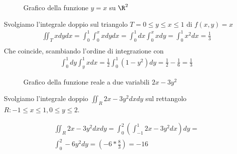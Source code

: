 \begin{exmp}
    \begin{figure}[htbp]
        \centering
        \caption{Grafico della funzione $y = x$ su $\R^2$}
        \label{2varplot}
    \end{figure}
    Svolgiamo l'integrale doppio sul triangolo $ T = 0 \leq y \leq x \leq 1$ di
    $f(x,y) = x$
    \begin{equation*}
        \begin{aligned}
            \iint_T x dydx = \int_0^1 \int_0^x x dydx = \int_0^1 dx \int_0^x x dy = \int_0^1 x^2 dx = \frac{1}{3} \\
        \end{aligned}
    \end{equation*}
    Che coincide, scambiando l'ordine di integrazione con
    \begin{equation*}
        \begin{aligned}
            \int_0^1 dy \int_y^1 x dx = \frac{1}{2} \int_0^1 (1-y^2) dy = \frac{1}{2} - \frac{1}{6} = \frac{1}{3}
        \end{aligned}
    \end{equation*}

\end{exmp}

\begin{exmp}
    \begin{figure}[htbp]
        \centering
        \caption{Grafico della funzione reale a due variabili $2x-3y^2$}
        \label{2varplot2}
    \end{figure}
    Svolgiamo l'integrale doppio $\iint_R 2x-3y^2 dx dy$ sul rettangolo $R: -1
    \leq x \leq 1, 0 \leq y \leq 2$.

    \begin{equation*}
        \begin{aligned}
            \iint_R 2x-3y^2 dx dy = \int_0^2 \left( \int_{-1}^1 2x - 3y^2 dx \right) dy = \\
            \int_0^2 -6y^2 dy = (-6* \frac{8}{3}) = -16
        \end{aligned}
    \end{equation*}

\end{exmp}

